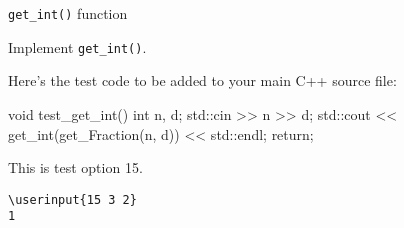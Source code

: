 \verb!get_int()! function

Implement \verb!get_int()!.

Here's the test code to be added to your main C++ source file:
\begin{console}
void test_get_int()
{
    int n, d;
    std::cin >> n >> d;
    std::cout << get_int(get_Fraction(n, d)) << std::endl;
    return;
}
\end{console}
This is test option 15.

\resett
\nextt
\begin{Verbatim}[frame=single, commandchars=\\\{\}]
\userinput{15 3 2}
1
\end{Verbatim}
